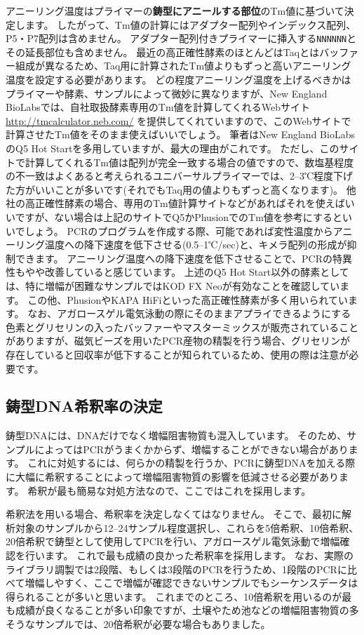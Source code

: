 \documentclass[titlepage,10pt,a4paper]{jsbook}
\begin{document}
アニーリング温度はプライマーの\textbf{鋳型にアニールする部位}のTm値に基づいて決定します。
したがって、Tm値の計算にはアダプター配列やインデックス配列、P5・P7配列は含めません。
アダプター配列付きプライマーに挿入する\texttt{NNNNNN}とその延長部位も含めません。
最近の高正確性酵素のほとんどはTaqとはバッファー組成が異なるため、Taq用に計算されたTm値よりもずっと高いアニーリング温度を設定する必要があります。
どの程度アニーリング温度を上げるべきかはプライマーや酵素、サンプルによって微妙に異なりますが、New England BioLabsでは、自社取扱酵素専用のTm値を計算してくれるWebサイト \url{http://tmcalculator.neb.com/} を提供してくれていますので、このWebサイトで計算させたTm値をそのまま使えばいいでしょう。
筆者はNew England BioLabsのQ5 Hot Startを多用していますが、最大の理由がこれです。
ただし、このサイトで計算してくれるTm値は配列が完全一致する場合の値ですので、数塩基程度の不一致はよくあると考えられるユニバーサルプライマーでは、2--3℃程度下げた方がいいことが多いです(それでもTaq用の値よりもずっと高くなります)。
他社の高正確性酵素の場合、専用のTm値計算サイトなどがあればそれを使えばいいですが、ない場合は上記のサイトでQ5かPhusionでのTm値を参考にするといいでしょう。
PCRのプログラムを作成する際、可能であれば変性温度からアニーリング温度への降下速度を低下させる(0.5--1℃/sec)と、キメラ配列の形成が抑制できます\citep{Stevens2013}。
アニーリング温度への降下速度を低下させることで、PCRの特異性もやや改善していると感じています。
上述のQ5 Hot Start以外の酵素としては、特に増幅が困難なサンプルではKOD FX Neoが有効なことを確認しています。
この他、PhusionやKAPA HiFiといった高正確性酵素が多く用いられています。
なお、アガロースゲル電気泳動の際にそのままアプライできるようにする色素とグリセリンの入ったバッファーやマスターミックスが販売されていることがありますが、磁気ビーズを用いたPCR産物の精製を行う場合、グリセリンが存在していると回収率が低下することが知られているため、使用の際は注意が必要です。

\subsection{鋳型DNA希釈率の決定}

鋳型DNAには、DNAだけでなく増幅阻害物質も混入しています。
そのため、サンプルによってはPCRがうまくかからず、増幅することができない場合があります。
これに対処するには、何らかの精製を行うか、PCRに鋳型DNAを加える際に大幅に希釈することによって増幅阻害物質の影響を低減させる必要があります。
希釈が最も簡易な対処方法なので、ここではこれを採用します。

希釈法を用いる場合、希釈率を決定しなくてはなりません。
そこで、最初に解析対象のサンプルから12--24サンプル程度選択し、これらを5倍希釈、10倍希釈、20倍希釈で鋳型として使用してPCRを行い、アガロースゲル電気泳動で増幅確認を行います。
これで最も成績の良かった希釈率を採用します。
なお、実際のライブラリ調製では2段階、もしくは3段階のPCRを行うため、1段階のPCRに比べて増幅しやすく、ここで増幅が確認できないサンプルでもシーケンスデータは得られることが多いと思います。
これまでのところ、10倍希釈を用いるのが最も成績が良くなることが多い印象ですが、土壌やため池などの増幅阻害物質の多そうなサンプルでは、20倍希釈が必要な場合もありました。
\end{document}
